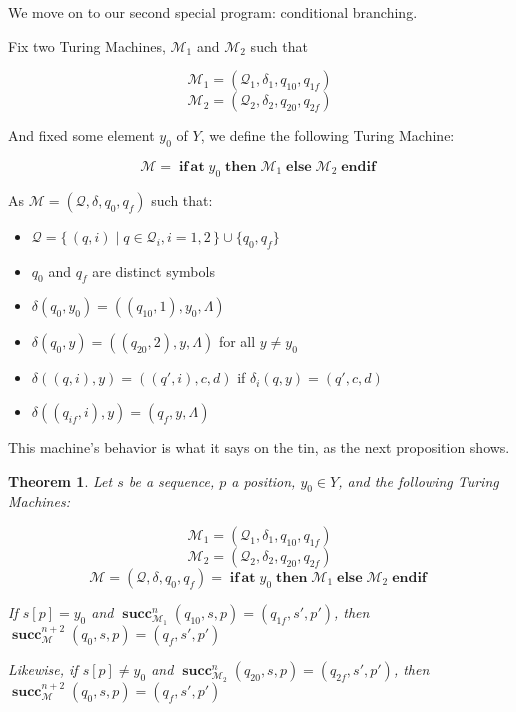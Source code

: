 \documentclass{article}
\newtheorem{theorem}{Theorem}
\newcommand{\M}{\mathcal{M}}
\newcommand{\Q}{\mathcal{Q}}
\DeclareMathOperator{\suc}{\mathbf{succ}}
\DeclareMathOperator{\Nifat}{\mathbf{if\,at}}
\DeclareMathOperator{\Nthen}{\mathbf{then}}
\DeclareMathOperator{\Nelse}{\mathbf{else}}
\DeclareMathOperator{\Nendif}{\mathbf{endif}}
\begin{document}
	We move on to our second special program: conditional branching.
	
	Fix two Turing Machines, $\M_1$ and $\M_2$ such that
	
	\[\M_1 = (\Q_1, \delta_1, q_{10}, q_{1f})\]
	\[\M_2 = (\Q_2, \delta_2, q_{20}, q_{2f})\]
	
	And fixed some element $y_0$ of $Y$, we define the following Turing Machine:
	
	\[ \M = \Nifat y_0 \Nthen \M_1 \Nelse \M_2 \Nendif \]
	
	As $\M = (\Q, \delta, q_0, q_f)$ such that:
	
	\begin{itemize}
	\item $\Q = \{\,(q, i) \mid q \in \Q_i, i = 1,2\,\} \cup \{q_0, q_f\}$
	
	\item $q_0$ and $q_f$ are distinct symbols %
	
	\item $\delta(q_0, y_0) = ((q_{10}, 1), y_0, \Lambda)$
	
	\item $\delta(q_0, y) = ((q_{20}, 2), y, \Lambda)$ for all $y \neq y_0$
	
	\item $\delta((q, i), y) = ((q', i), c, d)$ if $\delta_i(q, y) = (q', c, d)$
	
	\item $\delta((q_{if}, i), y) = (q_f, y, \Lambda)$
	\end{itemize}
	
	This machine's behavior is what it says on the tin, as the next proposition shows.
	
	\begin{theorem}
	Let $s$ be a sequence, $p$ a position, $y_0 \in Y$, and the following Turing Machines:
	
	
	\[\M_1 = (\Q_1, \delta_1, q_{10}, q_{1f})\]
	\[\M_2 = (\Q_2, \delta_2, q_{20}, q_{2f})\]
	\[\M = (\Q, \delta, q_0, q_f) = \Nifat y_0 \Nthen \M_1 \Nelse \M_2 \Nendif \]
	
	If $s[p] = y_0$ and $\suc^n_{\M_1} (q_{10}, s, p) = (q_{1f}, s', p')$, then $\suc^{n+2}_\M (q_0, s, p) = (q_f, s', p')$
	
	Likewise, if $s[p] \neq y_0$ and $\suc^n_{\M_2} (q_{20}, s, p) = (q_{2f}, s', p')$, then $\suc^{n+2}_\M (q_0, s, p) = (q_f, s', p')$
	\end{theorem}
	
\end{document}
